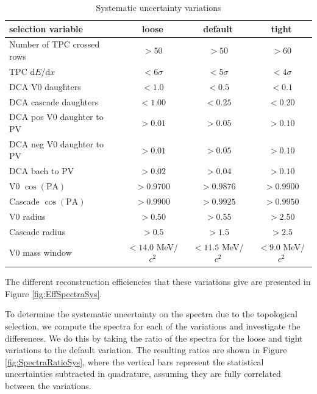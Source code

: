     \begin{table}[ht]
      \centering
      \begin{tabular}{l|c|c|c}
        selection variable & loose & default & tight \\
        \hline
        Number of TPC crossed rows & $> 50$ & $> 50$ & $> 60$ \\
        \hline
        TPC d$E$/d$x$ & $< 6\sigma$ & $< 5\sigma$ & $< 4\sigma$ \\
        \hline
        DCA V0 daughters & $< 1.0$ & $< 0.5$ & $< 0.1$ \\
        \hline
        DCA cascade daughters & $< 1.00$ & $< 0.25$ & $< 0.20$ \\
        \hline
        DCA pos V0 daughter to PV & $> 0.01$ & $> 0.05$ & $> 0.10$ \\
        \hline
        DCA neg V0 daughter to PV & $> 0.01$ & $> 0.05$ & $> 0.10$ \\
        \hline
        DCA bach to PV & $> 0.02$ & $> 0.04$ & $> 0.10$ \\
        \hline
        V0 $\cos(\text{PA})$ & $> 0.9700$ & $> 0.9876$ & $> 0.9900$ \\
        \hline
        Cascade $\cos(\text{PA})$ & $> 0.9900$ & $> 0.9925$ & $> 0.9950$ \\
        \hline
        V0 radius & $> 0.50$ & $> 0.55$ & $> 2.50$ \\
        \hline
        Cascade radius & $> 0.5$ & $> 1.5$ & $> 2.5$ \\
        \hline
        V0 mass window & $< 14.0$ MeV/$c^2$ & $< 11.5$ MeV/$c^2$ & $< 9.0$ MeV/$c^2$ \\
        \hline
      \end{tabular}
      \caption{Systematic uncertainty variations }
      \label{tab:syssel}
    \end{table}

    The different reconstruction efficiencies that these variations give are presented in Figure \ref{fig:EffSpectraSys}.  
    
    To determine the systematic uncertainty on the spectra due to the topological selection, we compute the spectra for each of the variations and investigate the differences. We do this by taking the ratio of the spectra for the loose and tight variations to the default variation.  The resulting ratios are shown in Figure \ref{fig:SpectraRatioSys}, where the vertical bars represent the statistical uncertainties subtracted in quadrature, assuming they are fully correlated between the variations. 

